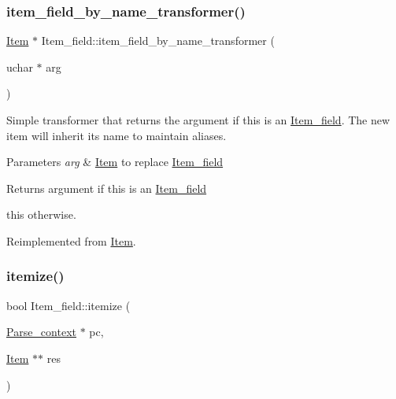 \subsubsection{\texorpdfstring{item\+\_\+field\+\_\+by\+\_\+name\+\_\+transformer()}{item\_field\_by\_name\_transformer()}}
{\footnotesize\ttfamily \mbox{\hyperlink{classItem}{Item}} $\ast$ Item\+\_\+field\+::item\+\_\+field\+\_\+by\+\_\+name\+\_\+transformer (\begin{DoxyParamCaption}\item[{uchar $\ast$}]{arg }\end{DoxyParamCaption})\hspace{0.3cm}{\ttfamily [virtual]}}

Simple transformer that returns the argument if this is an \mbox{\hyperlink{classItem__field}{Item\+\_\+field}}. The new item will inherit it\textquotesingle{}s name to maintain aliases.


\begin{DoxyParams}{Parameters}
{\em arg} & \mbox{\hyperlink{classItem}{Item}} to replace \mbox{\hyperlink{classItem__field}{Item\+\_\+field}}\\
\hline
\end{DoxyParams}
\begin{DoxyReturn}{Returns}
argument if this is an \mbox{\hyperlink{classItem__field}{Item\+\_\+field}} 

this otherwise. 
\end{DoxyReturn}


Reimplemented from \mbox{\hyperlink{classItem_ae697702435e782119336e6fc3fb6d204}{Item}}.

\mbox{\label{classItem__field_a6220537b7094a20e4dfb15e229e1a33c}} 
\subsubsection{\texorpdfstring{itemize()}{itemize()}}
{\footnotesize\ttfamily bool Item\+\_\+field\+::itemize (\begin{DoxyParamCaption}\item[{\mbox{\hyperlink{structParse__context}{Parse\+\_\+context}} $\ast$}]{pc,  }\item[{\mbox{\hyperlink{classItem}{Item}} $\ast$$\ast$}]{res }\end{DoxyParamCaption})\hspace{0.3cm}{\ttfamily [virtual]}}

